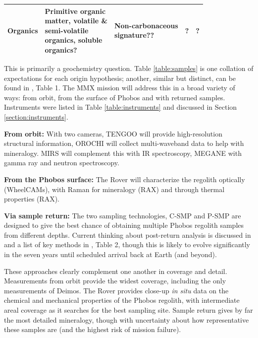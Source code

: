 \begin{table}[hbt!]
\begin{tabular}{|l|l|l|l|l|}
		Organics & 
		\makecell{Primitive organic\\ matter, volatile \& \\semi-volatile \\organics, soluble \\organics?} & 
		\makecell{Non-carbonaceous \\signature??} & 
		? & 
		? \\
		\hline
	\end{tabular}
\end{table}

This is primarily a geochemistry question. Table \ref{table:samples} is one collation of expectations for each origin hypothesis; another, similar but distinct, can be found in \citet{murchie_value_2014}{, Table 1}. The MMX mission will address this in a broad variety of ways: from orbit, from the surface of Phobos and with returned samples. Instruments were listed in Table \ref{table:instruments} and discussed in Section \ref{section:instruments}.

\textbf{From orbit:} With two cameras, TENGOO will provide high-resolution structural information, OROCHI will collect multi-waveband data to help with mineralogy. MIRS will complement this with IR spectroscopy, MEGANE with gamma ray and neutron spectroscopy.

\textbf{From the Phobos surface:} The Rover will characterize the regolith optically (WheelCAMs), with Raman for mineralogy (RAX) and through thermal properties (RAX).

\textbf{Via sample return:} The two sampling technologies, C-SMP and P-SMP are designed to give the best chance of obtaining multiple Phobos regolith samples from different depths. Current thinking about post-return analysis is discussed in \citet{fujiya_analytical_2021} and a list of key methods in \citet{usui_importance_2020}, Table 2, though this is likely to evolve significantly in the seven years until scheduled arrival back at Earth (and beyond).

These approaches clearly complement one another in coverage and detail. Measurements from orbit provide the widest coverage, including the only measurements of Deimos. The Rover provides close-up \textit{in situ} data on the chemical and mechanical properties of the Phobos regolith, with intermediate areal coverage as it searches for the best sampling site.  Sample return gives by far the most detailed mineralogy, though with uncertainty about how representative these samples are (and the highest risk of mission failure).

